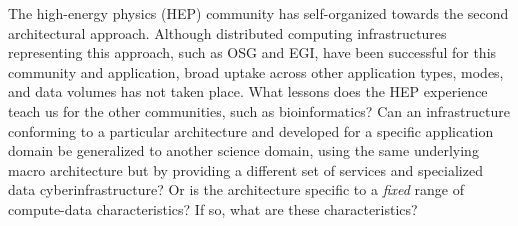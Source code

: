 The high-energy physics (HEP) community has self-organized towards the
second architectural approach.  Although distributed computing
infrastructures representing this approach, such as OSG and EGI, have
been successful for this community and application, broad uptake
across other application types, modes, and data volumes has not taken
place. What lessons does the HEP experience teach us for the other
communities, such as bioinformatics?  Can an infrastructure
conforming to a particular architecture and developed for a specific
application domain be generalized to another science domain, using the
same underlying macro architecture but by providing a different set of
services and specialized data cyberinfrastructure? Or is the
architecture specific to a {\it fixed} range of compute-data
characteristics? If so, what are these characteristics?


%
%


